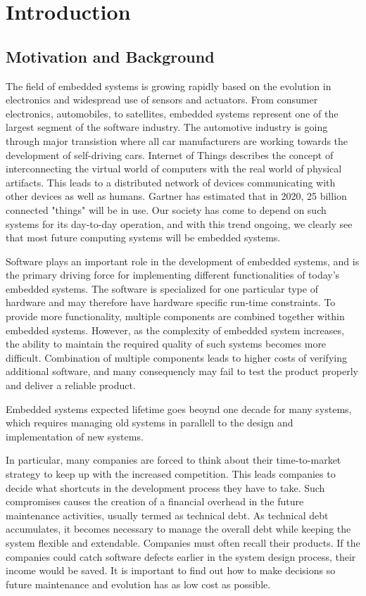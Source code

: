 \chapter{Introduction}

\section{Motivation and Background}
The field of embedded systems is growing rapidly based on the evolution in electronics and widespread use of sensors and actuators. From consumer electronics, automobiles, to satellites, embedded systems represent one of the largest segment of the software industry. The automotive industry is going through major transistion where all car manufacturers are working towards the development of self-driving cars. Internet of Things describes the concept of interconnecting the virtual world of computers with the real world of physical artifacts\cite{mattern2010internet}. This leads to a distributed network of devices communicating with other devices as well as humans. Gartner has estimated that in 2020, 25 billion connected "things" will be in use\cite{gartner}. Our society has come to depend on such systems for its day-to-day operation, and with this trend ongoing, we clearly see that most future computing systems will be embedded systems\cite{wolfmadsen-2000}. 

Software plays an important role in the development of embedded systems, and is the primary driving force for implementing different functionalities of today's embedded systems. The software is specialized for one particular type of hardware and may therefore have hardware specific run-time constraints. To provide more functionality, multiple components are combined together within embedded systems. However, as the complexity of embedded system increases, the ability to maintain the required quality of such systems becomes more difficult. Combination of multiple components leads to higher costs of verifying additional software, and many consequencly may fail to test the product properly and deliver a reliable product.  

Embedded systems expected lifetime goes beoynd one decade for many systems, which requires managing old systems in parallell to the design and implementation of new systems. 

In particular, many companies are forced to think about their time-to-market strategy to keep up with the increased competition. This leads companies to decide what shortcuts in the development process they have to take. Such compromises causes the creation of a financial overhead in the future maintenance activities, usually termed as technical debt\cite{p29-cunningham}. As technical debt accumulates, it becomes necessary to manage the overall debt while keeping the system flexible and extendable. Companies must often recall their products. If the companies could catch software defects earlier in the system design process, their income would be saved. It is important to find out how to make decisions so future maintenance and evolution has as low cost as possible. 

